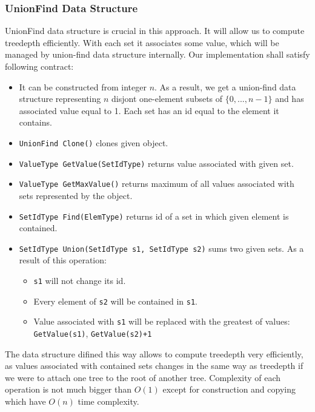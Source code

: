 \subsubsection{UnionFind Data Structure}
UnionFind data structure is crucial in this approach. It will allow us to compute treedepth efficiently. With each set it associates some value, which will be managed by union-find data structure internally. Our implementation shall satisfy following contract:
\begin{itemize}
	\item It can be constructed from integer $n$. As a result, we get a union-find data structure representing $n$ disjont one-element subsets of $\{0,...,n-1\}$ and has associated value equal to 1. Each set has an id equal to the element it contains.
	\item \texttt{UnionFind Clone()} clones given object.
	\item \texttt{ValueType GetValue(SetIdType)} returns value associated with given set.
	\item \texttt{ValueType GetMaxValue()} returns maximum of all values associated with sets represented by the object.
	\item \texttt{SetIdType Find(ElemType)} returns id of a set in which given element is contained.
	\item \texttt{SetIdType Union(SetIdType s1, SetIdType s2)} sums two given sets. As a result of this operation:
	\begin{itemize}
		\item \texttt{s1} will not change its id.
		\item Every element of \texttt{s2} will be contained in \texttt{s1}.
		\item Value associated with \texttt{s1} will be replaced with the greatest of values: \texttt{GetValue(s1)}, \texttt{GetValue(s2)+1}
	\end{itemize}
\end{itemize}
The data structure difined this way allows to compute treedepth very efficiently, as values associated with contained sets changes in the same way as treedepth if we were to attach one tree to the root of another tree. Complexity of each operation is not much bigger than $O(1)$ except for construction and copying which have $O(n)$ time complexity.
